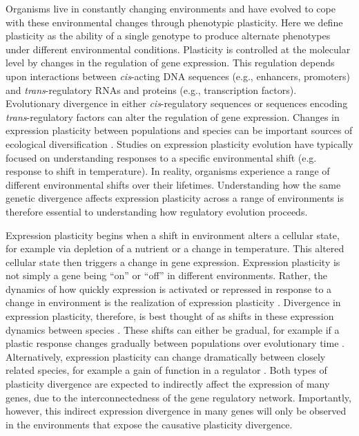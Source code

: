 Organisms live in constantly changing environments and have evolved to cope with these environmental changes through phenotypic plasticity. Here we define plasticity as the ability of a single genotype to produce alternate phenotypes under different environmental conditions. Plasticity is controlled at the molecular level by changes in the regulation of gene expression. This regulation depends upon interactions between \textit{cis}-acting DNA sequences (e.g., enhancers, promoters) and \textit{trans}-regulatory RNAs and proteins (e.g., transcription factors). Evolutionary divergence in either \textit{cis}-regulatory sequences or sequences encoding \textit{trans}-regulatory factors can alter the regulation of gene expression. Changes in expression plasticity between populations and species can be important sources of ecological diversification \cite{HodginsDavis2009, Lasky2014, Ghalambor2015, Makinen2018, Ballinger2023}. Studies on expression plasticity evolution have typically focused on understanding responses to a specific environmental shift (e.g. response to shift in temperature). In reality, organisms experience a range of different environmental shifts over their lifetimes. Understanding how the same genetic divergence affects expression plasticity across a range of environments is therefore essential to understanding how regulatory evolution proceeds.

Expression plasticity begins when a shift in environment alters a cellular state, for example via depletion of a nutrient or a change in temperature. This altered cellular state then triggers a change in gene expression. Expression plasticity is not simply a gene being ``on” or ``off” in different environments. Rather, the dynamics of how quickly expression is activated or repressed in response to a change in environment is the realization of expression plasticity \cite{Hager2009, Rivera2021, Wagh2023}. Divergence in expression plasticity, therefore, is best thought of as shifts in these expression dynamics between species \cite{Koster2015}. These shifts can either be gradual, for example if a plastic response changes gradually between populations over evolutionary time \cite{Makinen2018}. Alternatively, expression plasticity can change dramatically between closely related species, for example a gain of function in a regulator \cite{Soppe2000}. Both types of plasticity divergence are expected to indirectly affect the expression of many genes, due to the interconnectedness of the gene regulatory network. Importantly, however, this indirect expression divergence in many genes will only be observed in the environments that expose the causative plasticity divergence.

